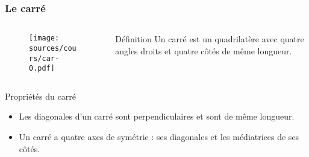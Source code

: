 \documentclass{beamer}
\begin{document}
\begin{frame}
  \frametitle{Le carré}
  
  \begin{columns}[t]
    \begin{column}{4cm}
      \begin{block}{}	
        \begin{figure}[H]
          \centering
          \texttt{[image: sources/cours/car-0.pdf]}
        \end{figure}
      \end{block} 
    \end{column}
    \begin{column}{6cm}
      \begin{alertblock}{Définition}	
	Un carré est un quadrilatère avec quatre angles droits et quatre côtés de même longueur.
      \end{alertblock}
    \end{column}
  \end{columns} 
  
  \begin{block}{Propriétés du carré}	
    \begin{itemize}
    \item Les diagonales d'un carré sont perpendiculaires et sont de même longueur.
    \item Un carré a quatre axes de symétrie : ses diagonales et les médiatrices de ses côtés.
    \end{itemize}
  \end{block} 
\end{frame}
\end{document}
